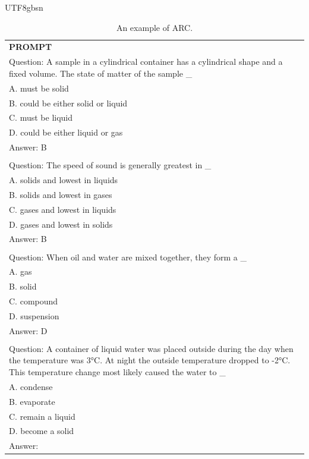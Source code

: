 \documentclass[11pt, a4paper, logo, copyright, nonumbering]{deepseek}
\begin{document}
\begin{CJK*}{UTF8}{gbsn}
\begin{table}[ht]
    \centering \small
\begin{tabular}{p{12cm}}
\toprule
\textbf{PROMPT}\\
Question: A sample in a cylindrical container has a cylindrical shape and a fixed volume. The state of matter of the sample \_\\
A. must be solid\\
B. could be either solid or liquid\\
C. must be liquid\\
D. could be either liquid or gas\\
Answer: B\\
\\
Question: The speed of sound is generally greatest in \_\\
A. solids and lowest in liquids\\
B. solids and lowest in gases\\
C. gases and lowest in liquids\\
D. gases and lowest in solids\\
Answer: B\\
\\
Question: When oil and water are mixed together, they form a \_\\
A. gas\\
B. solid\\
C. compound\\
D. suspension\\
Answer: D\\
\\
Question: A container of liquid water was placed outside during the day when the temperature was 3°C. At night the outside temperature dropped to -2°C. This temperature change most likely caused the water to \_\\
A. condense\\
B. evaporate\\
C. remain a liquid\\
D. become a solid\\
Answer:\\
\bottomrule
\end{tabular}
    \caption{\centering An example of ARC.}
    \label{tab:arc_eval_format_example}
\end{table}


\end{CJK*}
\end{document}
